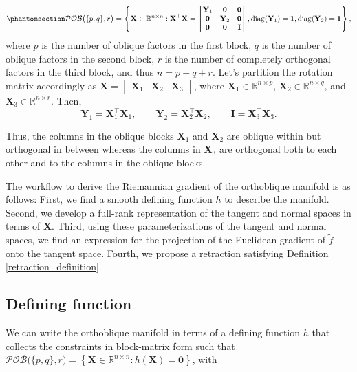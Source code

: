 \documentclass[
  12pt,
  letterpaper,
  article]{scrartcl}
\begin{document}
\begin{equation}\protect\phantomsection\label{eq-orthblq_definition}{
\mathcal{POB}\big(\{p,q\},r\big)
=
\left\{
\mathbf{X}\in\mathbb{R}^{n\times n}:
\mathbf{X}^\top\mathbf{X}
=
\begin{bmatrix}
\mathbf{Y}_1 & \mathbf{0} & \mathbf{0}\\
\mathbf{0} & \mathbf{Y}_2 & \mathbf{0}\\
\mathbf{0} & \mathbf{0} & \mathbf{I}
\end{bmatrix},
\mathrm{diag}(\mathbf{Y}_1)=\mathbf{1},
\mathrm{diag}(\mathbf{Y}_2)=\mathbf{1}
\right\},
}\end{equation} where \(p\) is the number of oblique factors in the
first block, \(q\) is the number of oblique factors in the second block,
\(r\) is the number of completely orthogonal factors in the third block,
and thus \(n=p+q+r\). Let's partition the rotation matrix accordingly as
\(\mathbf{X}=\begin{bmatrix}\mathbf{X}_1 & \mathbf{X}_2 & \mathbf{X}_3 \end{bmatrix}\),
where \(\mathbf{X}_1\in\mathbb{R}^{n\times p}\),
\(\mathbf{X}_2\in\mathbb{R}^{n\times q}\), and
\(\mathbf{X}_3\in\mathbb{R}^{n\times r}\). Then, \[
\mathbf{Y}_1 = \mathbf{X}_1^\top\mathbf{X}_1, \qquad
\mathbf{Y}_2 = \mathbf{X}_2^\top\mathbf{X}_2, \qquad
\mathbf{I} = \mathbf{X}_3^\top\mathbf{X}_3.
\]

Thus, the columns in the oblique blocks \(\mathbf{X}_1\) and
\(\mathbf{X}_2\) are oblique within but orthogonal in between whereas
the columns in \(\mathbf{X}_3\) are orthogonal both to each other and to
the columns in the oblique blocks.

The workflow to derive the Riemannian gradient of the orthoblique
manifold is as follows: First, we find a smooth defining function \(h\)
to describe the manifold. Second, we develop a full-rank representation
of the tangent and normal spaces in terms of \(\mathbf{X}\). Third,
using these parameterizations of the tangent and normal spaces, we find
an expression for the projection of the Euclidean gradient of
\(\tilde{f}\) onto the tangent space. Fourth, we propose a retraction
satisfying Definition \ref{retraction_definition}.

\subsection{Defining function}\label{defining-function}

We can write the orthoblique manifold in terms of a defining function
\(h\) that collects the constraints in block-matrix form such that
\(\mathcal{POB}\big(\{p,q\},r\big) = \left\{ \mathbf{X}\in\mathbb{R}^{n\times n}: h(\mathbf{X}) = \mathbf{0} \right\}\),
with
\end{document}
